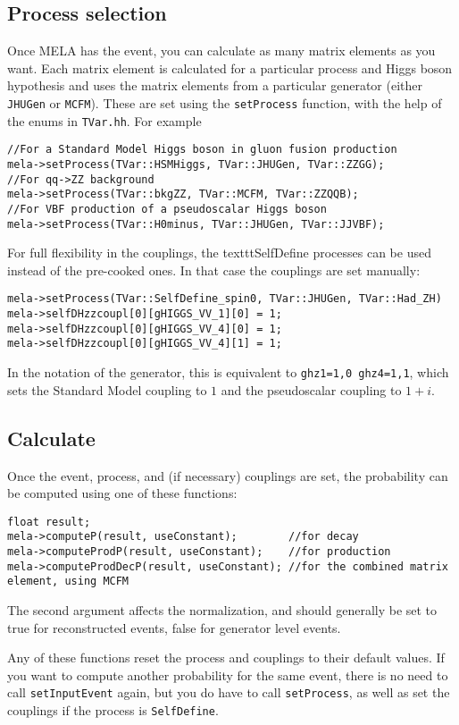 \documentclass[aps,superscriptaddress,nofootinbib]{revtex4}
\begin{document}
\subsection{Process selection}
Once MELA has the event, you can calculate as many matrix elements as you want.  Each matrix element is calculated for a particular process and Higgs boson hypothesis and uses the matrix elements from a particular generator (either \texttt{JHUGen} or \texttt{MCFM}).  These are set using the \texttt{setProcess} function, with the help of the enums in \texttt{TVar.hh}.  For example
\begin{verbatim}
//For a Standard Model Higgs boson in gluon fusion production
mela->setProcess(TVar::HSMHiggs, TVar::JHUGen, TVar::ZZGG);
//For qq->ZZ background
mela->setProcess(TVar::bkgZZ, TVar::MCFM, TVar::ZZQQB);
//For VBF production of a pseudoscalar Higgs boson
mela->setProcess(TVar::H0minus, TVar::JHUGen, TVar::JJVBF);
\end{verbatim}

For full flexibility in the couplings, the texttt{SelfDefine} processes can be used instead of the pre-cooked ones.  In that case the couplings are set manually:
\begin{verbatim}
mela->setProcess(TVar::SelfDefine_spin0, TVar::JHUGen, TVar::Had_ZH)
mela->selfDHzzcoupl[0][gHIGGS_VV_1][0] = 1;
mela->selfDHzzcoupl[0][gHIGGS_VV_4][0] = 1;
mela->selfDHzzcoupl[0][gHIGGS_VV_4][1] = 1;
\end{verbatim}
In the notation of the generator, this is equivalent to \texttt{ghz1=1,0 ghz4=1,1}, which sets the Standard Model coupling to $1$ and the pseudoscalar coupling to $1+i$.

\subsection{Calculate}
Once the event, process, and (if necessary) couplings are set, the probability can be computed using one of these functions:
\begin{verbatim}
float result;
mela->computeP(result, useConstant);        //for decay
mela->computeProdP(result, useConstant);    //for production
mela->computeProdDecP(result, useConstant); //for the combined matrix element, using MCFM
\end{verbatim}
The second argument affects the normalization, and should generally be set to true for reconstructed events, false for generator level events.

Any of these functions reset the process and couplings to their default values.  If you want to compute another probability for the same event, there is no need to call \texttt{setInputEvent} again, but you do have to call \texttt{setProcess}, as well as set the couplings if the process is \texttt{SelfDefine}.
\end{document}
